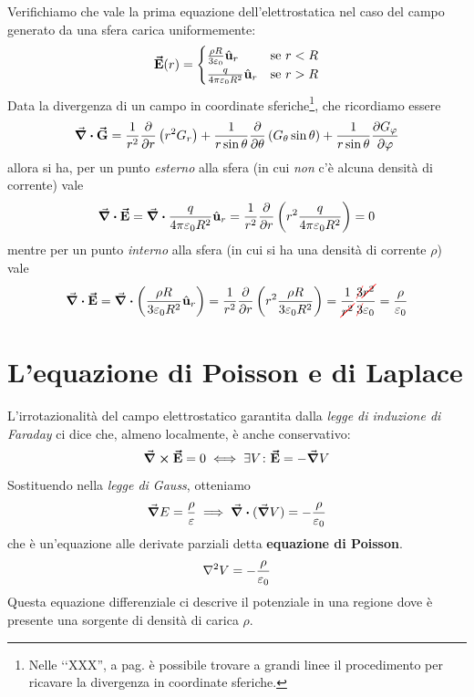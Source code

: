 \begin{examplewt}
	Verifichiamo che vale la prima equazione dell'elettrostatica nel caso del campo generato da una sfera carica uniformemente:
	\begin{equation*}
		\vb*{\va{E}}(r)=\begin{cases}
			\frac{\rho R}{3\varepsilon_0}\hat{\mathbf{u}}_r&\text{se}\ r< R\\
			\frac{q}{4\pi\varepsilon_0 R^2}\hat{\mathbf{u}}_r &\text{se}\ r> R
		\end{cases}
	\end{equation*}
	Data la divergenza di un campo in coordinate sferiche\footnote{Nelle ‘‘XXX'', a pag. \pageref{DivergenzaSferiche} è possibile trovare a grandi linee il procedimento per ricavare la divergenza in coordinate sferiche.}, che ricordiamo essere
	\begin{equation*}
		\div{\vb*{\va{G}}}=\frac{1}{r^2}\pdv{r}\left(r^2G_r\right)+\frac{1}{r\sin\theta}\pdv{\theta}\left(G_\theta\sin\theta\right)+\frac{1}{r\sin\theta}\pdv{G_\varphi}{\varphi}
	\end{equation*}
	allora si ha, per un punto \textit{esterno} alla sfera (in cui \textit{non} c'è alcuna densità di corrente) vale
	\begin{equation}
		\div{\vb*{\va{E}}}=\div{\frac{q}{4\pi\varepsilon_0 R^2}\hat{\mathbf{u}}_r}=\frac{1}{r^2}\pdv{r}\left(r^2\frac{q}{4\pi\varepsilon_0 R^2}\right)=0
	\end{equation}
	mentre per un punto \textit{interno} alla sfera (in cui si ha una densità di corrente $\rho$) vale
	\begin{equation*}
		\div{\vba{E}}=\div{\left(\frac{\rho R}{3\epsilon_0R^2}\vbh{u}_r\right)}=\frac{1}{r^2}\pdv{r}\left(r^2\frac{\rho R}{3\epsilon_0R^2}\right)=\frac{1}{\Ccancel[red]{r^2}}\frac{\Ccancel[red]{3}\Ccancel[red]{r^2}}{\Ccancel[red]{3}\epsilon_0}=\frac{\rho}{\epsilon_0}
	\end{equation*}
\end{examplewt}
\section{L'equazione di Poisson e di Laplace}\label{EqPoissonSezione}
L'irrotazionalità del campo elettrostatico garantita dalla \textit{legge di induzione di Faraday} ci dice che, almeno localmente, è anche conservativo:
\begin{equation*}
	\curl{\vb*{\va{E}}}=0\iff \exists V\colon \vb*{\va{E}}=-\grad{V}
\end{equation*}
Sostituendo nella \textit{legge di Gauss}, otteniamo
\begin{equation*}
	\grad{E}=\frac{\rho}{\varepsilon}\implies\div{(\grad{V})}=-\frac{\rho}{\varepsilon_0}
\end{equation*}
che è un'equazione alle derivate parziali detta \textbf{equazione di Poisson}.
\begin{equation}
	\laplacian{V}=-\frac{\rho}{\epsilon_0}
\end{equation}
Questa equazione differenziale ci descrive il potenziale in una regione dove è presente una sorgente di densità di carica $\rho$.

